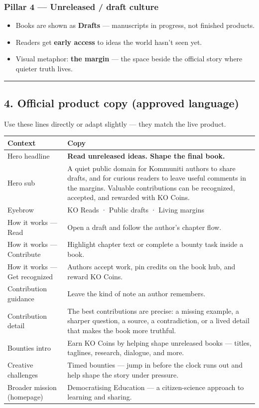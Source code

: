 \documentclass[11pt,a4paper]{report}
\begin{document}
\subsubsection{Pillar 4 --- Unreleased / draft culture}
\begin{itemize}
  \item Books are shown as \textbf{Drafts} --- manuscripts in progress, not finished products.
  \item Readers get \textbf{early access} to ideas the world hasn’t seen yet.
  \item Visual metaphor: \textbf{the margin} --- the space beside the official story where quieter truth lives.
\end{itemize}

\medskip\hrule\medskip

\subsection{4. Official product copy (approved language)}

Use these lines directly or adapt slightly --- they match the live product.


\begin{longtable}{|l|l|}
\hline
Context & Copy \\ \hline
Hero headline & \textbf{Read unreleased ideas. Shape the final book.} \\ \hline
Hero sub & A quiet public domain for Kommuniti authors to share drafts, and for curious readers to leave useful comments in the margins. Valuable contributions can be recognized, accepted, and rewarded with KO Coins. \\ \hline
Eyebrow & KO Reads · Public drafts · Living margins \\ \hline
How it works --- Read & Open a draft and follow the author’s chapter flow. \\ \hline
How it works --- Contribute & Highlight chapter text or complete a bounty task inside a book. \\ \hline
How it works --- Get recognized & Authors accept work, pin credits on the book hub, and reward KO Coins. \\ \hline
Contribution guidance & Leave the kind of note an author remembers. \\ \hline
Contribution detail & The best contributions are precise: a missing example, a sharper question, a source, a contradiction, or a lived detail that makes the book more truthful. \\ \hline
Bounties intro & Earn KO Coins by helping shape unreleased books --- titles, taglines, research, dialogue, and more. \\ \hline
Creative challenges & Timed bounties --- jump in before the clock runs out and help shape the story under pressure. \\ \hline
Broader mission (homepage) & Democratising Education --- a citizen-science approach to learning and sharing. \\
\hline
\end{longtable}
\end{document}
